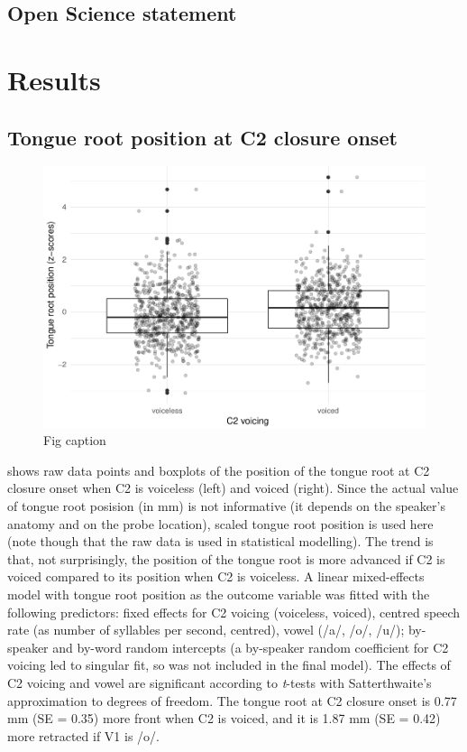 \documentclass[12pt,]{article}
\begin{document}
\hypertarget{open-science-statement}{%
\subsection{Open Science statement}\label{open-science-statement}}

\hypertarget{results}{%
\section{Results}\label{results}}

\hypertarget{tongue-root-position-at-c2-closure-onset}{%
\subsection{Tongue root position at C2 closure
onset}\label{tongue-root-position-at-c2-closure-onset}}

\begin{figure}
\includegraphics[width=\linewidth]{2018-tra_files/figure-latex/trp-z-box-1} \caption{Fig caption}\label{f:trp-z-box}
\end{figure}

 shows raw data points and boxplots of the position of
the tongue root at C2 closure onset when C2 is voiceless (left) and
voiced (right). Since the actual value of tongue root posision (in mm)
is not informative (it depends on the speaker's anatomy and on the probe
location), scaled tongue root position is used here (note though that
the raw data is used in statistical modelling). The trend is that, not
surprisingly, the position of the tongue root is more advanced if C2 is
voiced compared to its position when C2 is voiceless. A linear
mixed-effects model with tongue root position as the outcome variable
was fitted with the following predictors: fixed effects for C2 voicing
(voiceless, voiced), centred speech rate (as number of syllables per
second, centred), vowel (/a/, /o/, /u/); by-speaker and by-word random
intercepts (a by-speaker random coefficient for C2 voicing led to
singular fit, so was not included in the final model). The effects of C2
voicing and vowel are significant according to \emph{t}-tests with
Satterthwaite's approximation to degrees of freedom. The tongue root at
C2 closure onset is 0.77 mm (SE = 0.35) more front when C2 is voiced,
and it is 1.87 mm (SE = 0.42) more retracted if V1 is /o/.
\end{document}
